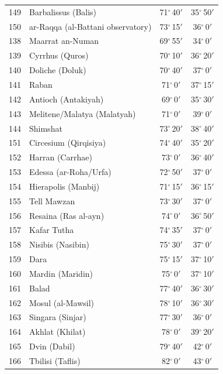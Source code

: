 \documentclass[10pt,a4paper]{article}
\begin{document}
\begin{longtable}{r >{\raggedright\arraybackslash}p{8.5cm} c c}
149 & Barbalissus (Balis) & 71$^\circ$\,40$'$ & 35$^\circ$\,50$'$\\
150 & ar-Raqqa (al-Battani observatory) & 73$^\circ$\,15$'$ & 36$^\circ$\,0$'$\\
138 & Maarrat an-Numan & 69$^\circ$\,55$'$ & 34$^\circ$\,0$'$\\
139 & Cyrrhus (Quros) & 70$^\circ$\,10$'$ & 36$^\circ$\,20$'$\\
140 & Doliche (Doluk) & 70$^\circ$\,40$'$ & 37$^\circ$\,0$'$\\
141 & Raban & 71$^\circ$\,0$'$ & 37$^\circ$\,15$'$\\
142 & Antioch (Antakiyah) & 69$^\circ$\,0$'$ & 35$^\circ$\,30$'$\\
143 & Melitene/Malatya (Malatyah) & 71$^\circ$\,0$'$ & 39$^\circ$\,0$'$\\
144 & Shimshat & 73$^\circ$\,20$'$ & 38$^\circ$\,40$'$\\
151 & Circesium (Qirqisiya) & 74$^\circ$\,40$'$ & 35$^\circ$\,20$'$\\
152 & Harran (Carrhae) & 73$^\circ$\,0$'$ & 36$^\circ$\,40$'$\\
153 & Edessa (ar-Roha/Urfa) & 72$^\circ$\,50$'$ & 37$^\circ$\,0$'$\\
154 & Hierapolis (Manbij) & 71$^\circ$\,15$'$ & 36$^\circ$\,15$'$\\
155 & Tell Mawzan & 73$^\circ$\,30$'$ & 37$^\circ$\,0$'$\\
156 & Resaina (Ras al-ayn) & 74$^\circ$\,0$'$ & 36$^\circ$\,50$'$\\
157 & Kafar Tutha & 74$^\circ$\,35$'$ & 37$^\circ$\,0$'$\\
158 & Nisibis (Nasibin) & 75$^\circ$\,30$'$ & 37$^\circ$\,0$'$\\
159 & Dara & 75$^\circ$\,15$'$ & 37$^\circ$\,10$'$\\
160 & Mardin (Maridin) & 75$^\circ$\,0$'$ & 37$^\circ$\,10$'$\\
161 & Balad & 77$^\circ$\,40$'$ & 36$^\circ$\,30$'$\\
162 & Mosul (al-Mawsil) & 78$^\circ$\,10$'$ & 36$^\circ$\,30$'$\\
163 & Singara (Sinjar) & 77$^\circ$\,30$'$ & 36$^\circ$\,0$'$\\
164 & Akhlat (Khilat) & 78$^\circ$\,0$'$ & 39$^\circ$\,20$'$\\
165 & Dvin (Dabil) & 79$^\circ$\,40$'$ & 42$^\circ$\,0$'$\\
166 & Tbilisi (Taflis) & 82$^\circ$\,0$'$ & 43$^\circ$\,0$'$\\

\end{longtable}
\end{document}
